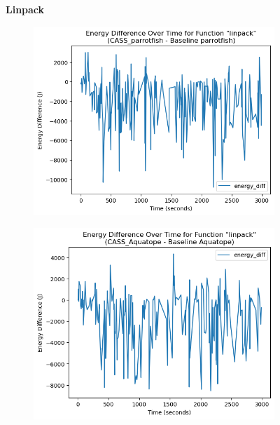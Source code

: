 \documentclass[times, 10pt,twocolumn]{article}
\begin{document}
\begin{figure}[ht]
   \textbf{Linpack}\par\medskip
   \begin{subfigure}[b]{0.4\textwidth}
      \includegraphics[width=\textwidth]{imgs/final_experiment_plots/energy_comparison/parrotfish/linpack.png}
     \caption{}
     \label{fig:linpack_energy_diff_parrotfish}
   \end{subfigure}
   \hfill
   \begin{subfigure}[b]{0.4\textwidth}
      \includegraphics[width=\textwidth]{imgs/final_experiment_plots/energy_comparison/aquatope/linpack.png}
     \caption{}
     \label{fig:linpack_energy_diff_aquatope}
   \end{subfigure}
   

\end{figure}
\end{document}
